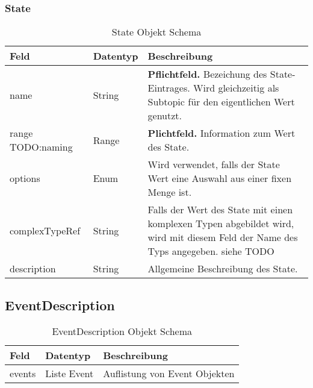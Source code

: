 \subsubsection{State}
\begin{table}[h!]
\begin{tabularx}{\textwidth}{|l|l|X|}

 \hline
 {\bf Feld } & {\bf Datentyp } & {\bf Beschreibung } \\  \hline

 name  &   String   & \textbf{Pflichtfeld.} Bezeichung des State-Eintrages. Wird gleichzeitig als Subtopic für den eigentlichen Wert genutzt.  \\ \hline
 range  TODO:naming &   Range   &  \textbf{Plichtfeld.} Information zum Wert des State.   \\ \hline
 options  &   Enum   & Wird verwendet, falls der State Wert eine Auswahl aus einer fixen Menge ist.   \\ \hline
 complexTypeRef  &   String   & Falls der Wert des State mit einen komplexen Typen abgebildet wird, wird mit diesem Feld der Name des Typs angegeben. siehe TODO   \\ \hline
 description  &   String   &  Allgemeine Beschreibung des State.  \\ \hline

\end{tabularx}
\caption{State Objekt Schema}
\end{table}


\subsection{EventDescription}
\begin{table}[h!]
\begin{tabularx}{\textwidth}{|l|l|X|}

 \hline
 {\bf Feld } & {\bf Datentyp } & {\bf Beschreibung } \\  \hline

 events  &   Liste Event   & Auflistung von Event Objekten   \\ \hline

\end{tabularx}
\caption{EventDescription Objekt Schema}
\end{table}


